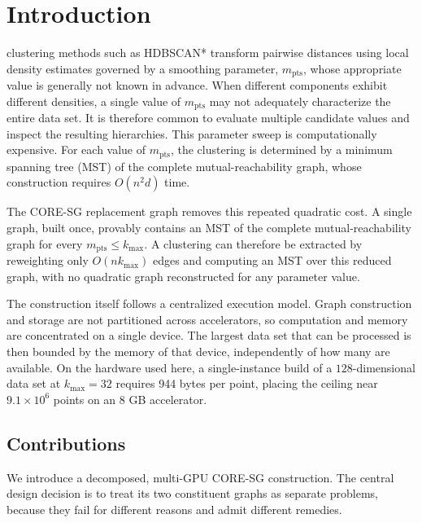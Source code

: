 \documentclass{ieeeaccess}
\newcommand{\kmax}{k_{\max}}
\newcommand{\mpts}{m_{\mathrm{pts}}}
\begin{document}
\section{Introduction}
\label{sec:intro}
 clustering methods such as HDBSCAN* transform pairwise distances using local density estimates governed by a smoothing parameter, $\mpts$, whose appropriate value is generally not known in advance. When different components exhibit different densities, a single value of $\mpts$ may not adequately characterize the entire data set. It is therefore common to evaluate multiple candidate values and inspect the resulting hierarchies. This parameter sweep is computationally expensive. For each value of $\mpts$, the clustering is determined by a minimum spanning tree (MST) of the complete mutual-reachability graph, whose construction requires $O(n^2 d)$ time.

The CORE-SG replacement graph \cite{coresg} removes this repeated quadratic cost. A single graph, built once, provably contains an MST of the complete mutual-reachability graph for every $\mpts \le \kmax$. A clustering can therefore be extracted by reweighting only $O(n\kmax)$ edges and computing an MST over this reduced graph, with no quadratic graph reconstructed for any parameter value.

The construction itself follows a centralized execution model. Graph construction and storage are not partitioned across accelerators, so computation and memory are concentrated on a single device. The largest data set that can be processed is then bounded by the memory of that device, independently of how many are available. On the hardware used here, a single-instance build of a $128$-dimensional data set at $\kmax = 32$ requires 944 bytes per point, placing the ceiling near $9.1\times10^6$ points on an 8 GB accelerator.

\subsection{Contributions}

We introduce a decomposed, multi-GPU CORE-SG construction. The central design decision is to
treat its two constituent graphs as separate problems, because they fail for
different reasons and admit different remedies.
\end{document}
